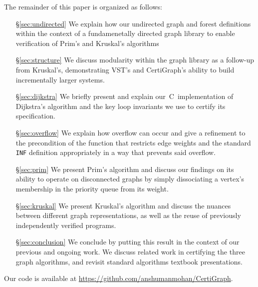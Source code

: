 The remainder of this paper is organized as follows:
\begin{itemize}
    \item[\S\ref{sec:undirected}] We explain how our undirected graph and forest definitions within the context of a fundamenetally directed graph library to enable verification of Prim's and Kruskal's algorithms
    \item[\S\ref{sec:structure}] We discuss modularity within the graph library as a follow-up from Kruskal's, demonstrating VST's and CertiGraph's ability to build incrementally larger systems.
    \item[\S\ref{sec:dijkstra}] We briefly present and explain
    our~C~implementation of Dijkstra's algorithm and the key loop invariants
    we use to certify its specification.
    \item[\S\ref{sec:overflow}] We explain how overflow can occur and give a
    refinement to the precondition of the function that restricts edge weights
    and the standard \texttt{INF} definition
    appropriately in a way that prevents said overflow.
    \item[\S\ref{sec:prim}] We present Prim's algorithm and discuss our findings on its ability to operate on disconnected graphs by simply dissociating a vertex's membership in the priority queue from its weight.
    \item[\S\ref{sec:kruskal}] We present Kruskal's algorithm and discuss the nuances between different graph representations, as well as the reuse of previously independently verified programs.
    \item[\S\ref{sec:conclusion}] We conclude by putting this result in the context of our
    previous and ongoing work. We discuss related work in certifying the three graph algorithms, and revisit standard algorithms textbook presentations.
\end{itemize}

\noindent Our code is available at \url{https://github.com/anshumanmohan/CertiGraph}.
